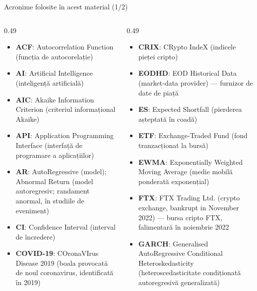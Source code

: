 
{
\begin{frame}[noframenumbering]
    \titlepage
\end{frame}
}
\begin{frame}{Acronime folosite în acest material (1/2)}
\begin{columns}[T]
\begin{column}{0.49\textwidth}
\begin{itemize}\setlength{\itemsep}{0pt}
    \item \textbf{ACF}: Autocorrelation Function (funcția de autocorelație)
    \item \textbf{AI}: Artificial Intelligence (inteligență artificială)
    \item \textbf{AIC}: Akaike Information Criterion (criteriul informațional Akaike)
    \item \textbf{API}: Application Programming Interface (interfață de programare a aplicațiilor)
    \item \textbf{AR}: AutoRegressive (model); Abnormal Return (model autoregresiv; randament anormal, în studiile de eveniment)
    \item \textbf{CI}: Confidence Interval (interval de încredere)
    \item \textbf{COVID-19}: COronaVIrus Disease 2019 (boala provocată de noul coronavirus, identificată în 2019)
\end{itemize}
\end{column}
\begin{column}{0.49\textwidth}
\begin{itemize}\setlength{\itemsep}{0pt}
    \item \textbf{CRIX}: CRypto IndeX (indicele pieței cripto)
    \item \textbf{EODHD}: EOD Historical Data (market-data provider) — furnizor de date de piață
    \item \textbf{ES}: Expected Shortfall (pierderea așteptată în coadă)
    \item \textbf{ETF}: Exchange-Traded Fund (fond tranzacționat la bursă)
    \item \textbf{EWMA}: Exponentially Weighted Moving Average (medie mobilă ponderată exponențial)
    \item \textbf{FTX}: FTX Trading Ltd. (crypto exchange, bankrupt in November 2022) — bursa cripto FTX, falimentară în noiembrie 2022
    \item \textbf{GARCH}: Generalised AutoRegressive Conditional Heteroskedasticity (heteroscedasticitate condiționată autoregresivă generalizată)
\end{itemize}
\end{column}
\end{columns}
\end{frame}
